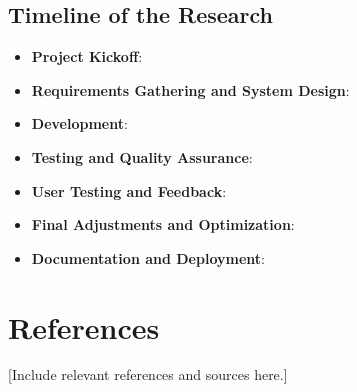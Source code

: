 \documentclass{article}
\begin{document}
\subsection{Timeline of the Research}
\begin{itemize}
  \item \textbf{Project Kickoff}:
  \item \textbf{Requirements Gathering and System Design}:
  \item \textbf{Development}:
  \item \textbf{Testing and Quality Assurance}:
  \item \textbf{User Testing and Feedback}:
  \item \textbf{Final Adjustments and Optimization}:
  \item \textbf{Documentation and Deployment}:
\end{itemize}

\section{References}
[Include relevant references and sources here.]
\end{document}
